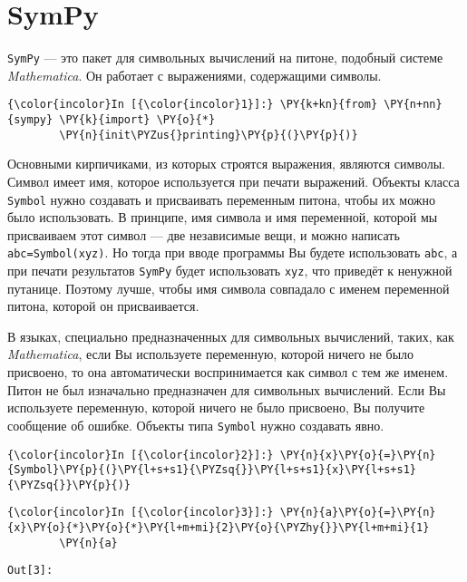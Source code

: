 \section{SymPy}
\label{sympy}

\texttt{SymPy} --- это пакет для символьных вычислений на питоне, подобный
системе \emph{Mathematica}. Он работает с выражениями, содержащими
символы.

    \begin{Verbatim}[commandchars=\\\{\}]
{\color{incolor}In [{\color{incolor}1}]:} \PY{k+kn}{from} \PY{n+nn}{sympy} \PY{k}{import} \PY{o}{*}
        \PY{n}{init\PYZus{}printing}\PY{p}{(}\PY{p}{)}
\end{Verbatim}

    Основными кирпичиками, из которых строятся выражения, являются символы.
Символ имеет имя, которое используется при печати выражений. Объекты
класса \texttt{Symbol} нужно создавать и присваивать переменным питона,
чтобы их можно было использовать. В принципе, имя символа и имя
переменной, которой мы присваиваем этот символ --- две независимые вещи, и
можно написать
\texttt{abc=Symbol(\textquotesingle{}xyz\textquotesingle{})}. Но тогда
при вводе программы Вы будете использовать \texttt{abc}, а при печати
результатов \texttt{SymPy} будет использовать \texttt{xyz}, что приведёт
к ненужной путанице. Поэтому лучше, чтобы имя символа совпадало с именем
переменной питона, которой он присваивается.

В языках, специально предназначенных для символьных вычислений, таких,
как \emph{Mathematica}, если Вы используете переменную, которой ничего
не было присвоено, то она автоматически воспринимается как символ с тем
же именем. Питон не был изначально предназначен для символьных
вычислений. Если Вы используете переменную, которой ничего не было
присвоено, Вы получите сообщение об ошибке. Объекты типа \texttt{Symbol}
нужно создавать явно.

    \begin{Verbatim}[commandchars=\\\{\}]
{\color{incolor}In [{\color{incolor}2}]:} \PY{n}{x}\PY{o}{=}\PY{n}{Symbol}\PY{p}{(}\PY{l+s+s1}{\PYZsq{}}\PY{l+s+s1}{x}\PY{l+s+s1}{\PYZsq{}}\PY{p}{)}
\end{Verbatim}

    \begin{Verbatim}[commandchars=\\\{\}]
{\color{incolor}In [{\color{incolor}3}]:} \PY{n}{a}\PY{o}{=}\PY{n}{x}\PY{o}{*}\PY{o}{*}\PY{l+m+mi}{2}\PY{o}{\PYZhy{}}\PY{l+m+mi}{1}
        \PY{n}{a}
\end{Verbatim}
\texttt{\color{outcolor}Out[{\color{outcolor}3}]:}
    

